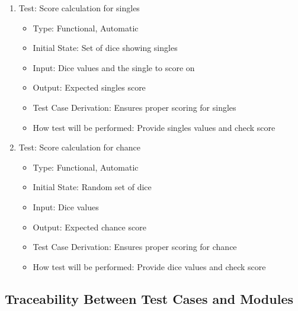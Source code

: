 \documentclass[12pt, titlepage]{article}
\begin{document}
\begin{enumerate}
    \item Test: Score calculation for singles
    \begin{itemize}
        \item Type: Functional, Automatic
        \item Initial State: Set of dice showing singles
        \item Input: Dice values and the single to score on
        \item Output: Expected singles score
        \item Test Case Derivation: Ensures proper scoring for singles
        \item How test will be performed: Provide singles values and check score
    \end{itemize}

    \item Test: Score calculation for chance
    \begin{itemize}
        \item Type: Functional, Automatic
        \item Initial State: Random set of dice
        \item Input: Dice values
        \item Output: Expected chance score
        \item Test Case Derivation: Ensures proper scoring for chance
        \item How test will be performed: Provide dice values and check score
    \end{itemize}

\end{enumerate}

\subsection{Traceability Between Test Cases and Modules}
\end{document}
